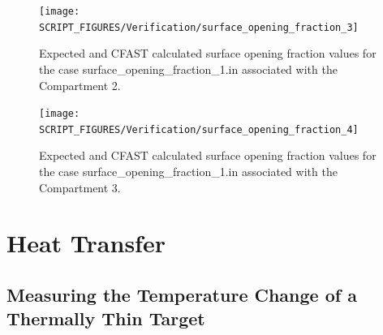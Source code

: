 \begin{figure}[!ht]
\centering
\texttt{[image: SCRIPT\_FIGURES/Verification/surface\_opening\_fraction\_3]}
\caption[Results of the test case {\ct surface\_opening\_fraction\_1.in}]{Expected and CFAST calculated surface opening fraction values for the case {\ct surface\_opening\_fraction\_1.in} associated with the Compartment 2.}
\label{SOF_Result_3}
\end{figure}

\begin{figure}[!ht]
\centering
\texttt{[image: SCRIPT\_FIGURES/Verification/surface\_opening\_fraction\_4]}
\caption[Results of the test case {\ct surface\_opening\_fraction\_1.in}]{Expected and CFAST calculated surface opening fraction values for the case {\ct surface\_opening\_fraction\_1.in} associated with the Compartment 3.}
\label{SOF_Result_4}
\end{figure}


\clearpage


\section{Heat Transfer}
\label{radiation}

\subsection{Measuring the Temperature Change of a Thermally Thin Target}
\label{radiation_1}

